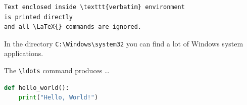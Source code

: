 \begin{verbatim}
Text enclosed inside \texttt{verbatim} environment 
is printed directly 
and all \LaTeX{} commands are ignored.
\end{verbatim}

In the directory \verb|C:\Windows\system32| you can find a lot of Windows 
system applications. 
 
The \verb+\ldots+ command produces \ldots

\begin{lstlisting}[language=Python]
def hello_world():
    print("Hello, World!")
\end{lstlisting}